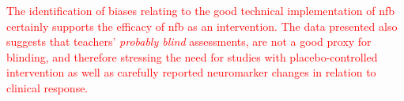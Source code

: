 \textcolor{red}{The identification of biases relating to the good technical implementation of \gls{nfb} 
certainly supports the efficacy of \gls{nfb} as an
intervention. The data presented also suggests that teachers' \emph{probably blind} assessments, are
not a good proxy for blinding, 
and therefore stressing the need for studies with placebo-controlled
intervention as well as carefully reported neuromarker changes in relation to
clinical response.}



